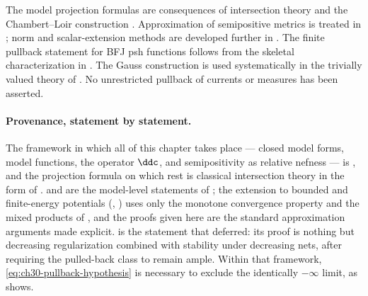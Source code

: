 The model projection formulas are consequences of intersection theory and
the Chambert--Loir construction \cite{CL06}.  Approximation of semipositive
metrics is treated in \cite{GM19}; norm and scalar-extension methods are
developed further in \cite{BE21}.  The finite pullback statement for BFJ psh
functions follows from the skeletal characterization in \cite{BFJ16}.  The
Gauss construction is used systematically in the trivially valued theory of
\cite{BJ22}.  No unrestricted pullback of currents or measures has been
asserted.

\paragraph{Provenance, statement by statement.}
The framework in which all of this chapter takes place --- closed model
forms, model functions, the operator \(\ddc\), and semipositivity as
relative nefness --- is \cite[\S\S2 and 4--5]{BFJ16}, and the projection
formula  on which
 rest is classical intersection
theory in the form of \cite[\S1.4 and \S2.3]{Ful}.
 and
 are the model-level statements of
\cite[\S2]{BFJ16}; the extension to bounded and finite-energy potentials
(,
) uses only the monotone convergence
property \cite[Theorem~3.1]{BFJ15} and the mixed products of
\cite[\S6]{BFJ15}, and the proofs given here are the standard
approximation arguments made explicit.
 is the statement that
 deferred: its proof is nothing but decreasing
regularization \cite[Theorem~8.3]{BFJ16} combined with stability under
decreasing nets, after requiring the pulled-back class to remain ample.
Within that framework, \eqref{eq:ch30-pullback-hypothesis} is necessary to
exclude the identically \(-\infty\) limit, as
 shows.

